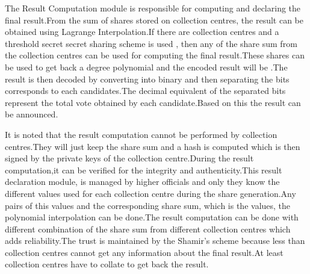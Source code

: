\documentclass[conference]{IEEEtran}
\begin{document}
The Result Computation module is responsible for computing and declaring the final result.From the sum of shares stored on collection centres, the result can be obtained using Lagrange Interpolation.If there are  collection centres and a  threshold secret secret sharing scheme is used , then any  of the share sum from the collection centres can be used for computing the final result.These  shares can be used to get back a  degree polynomial  and the encoded result will be .The result is then decoded by converting  into binary and then separating the bits corresponds to each candidates.The decimal equivalent of the separated bits represent the total vote obtained by each candidate.Based on this the result can be announced.

It is noted that the result computation cannot be performed by collection centres.They will just keep the share sum and a hash is computed which is then signed by the private keys of the collection centre.During the result computation,it can be verified for the integrity and authenticity.This result declaration module, is managed by  higher officials and only they know the different  values used for each collection centre during the share generation.Any  pairs of this  values and the corresponding share sum, which is the  values, the polynomial interpolation can be done.The result computation can be done with different combination of the share sum from  different collection centres which adds reliability.The trust is maintained by the Shamir's scheme because less than  collection centres cannot get any information about the final result.At least  collection centres have to collate to get back the result.
\end{document}
